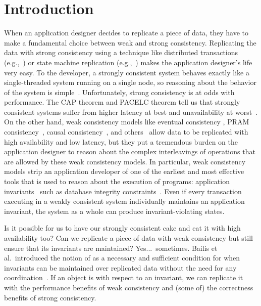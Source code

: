 \section{Introduction}
When an application designer decides to replicate a piece of data, they have to
make a fundamental choice between weak and strong consistency. Replicating the
data with strong consistency using a technique like distributed transactions
(e.g.,~\cite{bernstein1981concurrency,mohan1986transaction}) or state machine
replication (e.g.,~\cite{schneider1990implementing, lamport1998part,
liskov2012viewstamped, ongaro2014search}) makes the application designer's life
very easy. To the developer, a strongly consistent system behaves exactly like
a single-threaded system running on a single node, so reasoning about the
behavior of the system is simple~\cite{herlihy1990linearizability}.
Unfortunately, strong consistency is at odds with performance. The CAP theorem
and PACELC theorem tell us that strongly consistent systems suffer from higher
latency at best and unavailability at worst~\cite{gilbert2002brewer,
brewer2012cap, abadi2012consistency}. On the other hand, weak consistency
models like eventual consistency \cite{vogels2009eventually}, PRAM
consistency~\cite{lipton1988pram}, causal consistency~\cite{ahamad1995causal},
and others~\cite{lloyd2011don, mehdi2017can} allow data to be replicated with
high availability and low latency, but they put a tremendous burden on the
application designer to reason about the complex interleavings of operations
that are allowed by these weak consistency models. In particular, weak
consistency models strip an application developer of one of the earliest and
most effective tools that is used to reason about the execution of programs:
application invariants~\cite{hoare1969axiomatic, balegas2015towards} such as
database integrity constraints~\cite{grefen1993integrity, gupta1993local}. Even
if every transaction executing in a weakly consistent system individually
maintains an application invariant, the system as a whole can produce
invariant-violating states.

Is it possible for us to have our strongly consistent cake and eat it with high
availability too? Can we replicate a piece of data with weak consistency but
still ensure that its invariants are maintained? Yes...\ sometimes. Bailis et
al.\ introduced the notion of \emph{\invariantconfluence{}} as a necessary and
sufficient condition for when invariants can be maintained over replicated data
without the need for any coordination~\cite{bailis2014coordination}. If an
object is \invariantconfluent{} with respect to an invariant, we can replicate
it with the performance benefits of weak consistency and (some of) the
correctness benefits of strong consistency.

